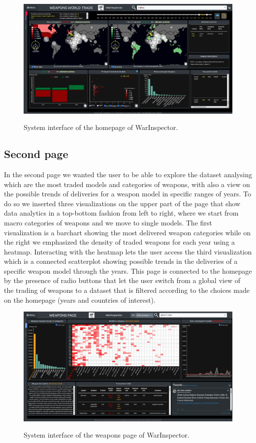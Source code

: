 \documentclass{article}
\begin{document}
\begin{multicols}{2}
\begin{figure}[ht!]
	\centering
	\includegraphics[scale=0.25,center]{./fig/screen1.png}
	\label{fig:va}
	\caption{System interface of the homepage of WarInspector.}
	
\end{figure}

\subsection{Second page}
In the second page we wanted the user to be able to explore the dataset analysing which are the most traded models and categories of weapons, with also a view on the possible trends of deliveries for a weapon model in specific ranges of years.
To do so we inserted three visualizations on the upper part of the page that show data analytics in a top-bottom fashion from left to right, where we start from macro categories of weapons and we move to single models. The first visualization is a barchart showing the most delivered weapon categories while on the right we emphasized the density of traded weapons for each year using  a heatmap. Interacting with the heatmap lets the user access the third visualization which is a connected scatterplot showing possible trends in the deliveries of a specific weapon model through the years. 
This page is connected to the homepage by the presence of radio buttons that let the user switch from a global view of the trading of weapons to a dataset that is filtered according to the choices made on the homepage (years and countries of interest). 


\begin{figure}[tb]
\centering
\includegraphics[scale=0.25,center]{./fig/screen2.png}
   \label{fig:va2}
    \caption{System interface of the weapons page of WarInspector.}


\end{figure}
\end{multicols}
\end{document}
